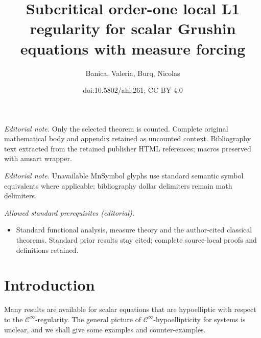 \documentclass[10pt]{amsart}
\title{Subcritical order-one local L1 regularity for scalar Grushin equations with measure forcing}
\author{Banica, Valeria, Burq, Nicolas}
\date{doi:10.5802/ahl.261; CC BY 4.0}
\theoremstyle{definition}\newtheorem{defi}[theo]{Definition}\newtheorem{rema}[theo]{Remark}\newtheorem{exam}[theo]{Example}\newtheorem{exem}[theo]{Example}\newtheorem{nota}[theo]{Notation}
\newcommand{\clC}{\mathcal{C}}
\begin{document}
\maketitle
\noindent\textit{Editorial note.} Only the selected theorem is counted. Complete original mathematical body and appendix retained as uncounted context. Bibliography text extracted from the retained publisher HTML references; macros preserved with amsart wrapper.\par\medskip
\noindent\textit{Editorial note.} Unavailable MnSymbol glyphs use standard semantic symbol equivalents where applicable; bibliography dollar delimiters remain math delimiters.\par\medskip
\noindent\textit{Allowed standard prerequisites (editorial).}\begin{itemize}
\item Standard functional analysis, measure theory and the author-cited classical theorems. Standard prior results stay cited; complete source-local proofs and definitions retained.
\end{itemize}\medskip

\section{Introduction}

Many results are available for scalar equations that are hypoelliptic with respect to the $\clC^\infty$-regularity. The general picture of $\clC^\infty$-hypoellipticity for systems is unclear, and we shall give some examples and counter-examples.
\end{document}
